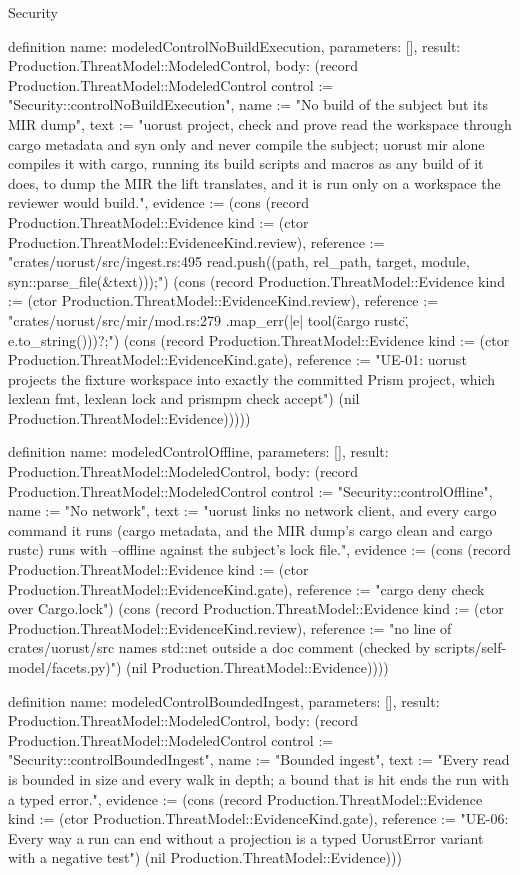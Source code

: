 \begin{lexlean}{Security}
\begin{semanticmodule}
definition{
  name: modeledControlNoBuildExecution,
  parameters: [],
  result: Production.ThreatModel::ModeledControl,
  body: (record Production.ThreatModel::ModeledControl {control := "Security::controlNoBuildExecution", name := "No build of the subject but its MIR dump", text := "uorust project, check and prove read the workspace through cargo metadata and syn only and never compile the subject; uorust mir alone compiles it with cargo, running its build scripts and macros as any build of it does, to dump the MIR the lift translates, and it is run only on a workspace the reviewer would build.", evidence := (cons (record Production.ThreatModel::Evidence {kind := (ctor Production.ThreatModel::EvidenceKind.review), reference := "crates/uorust/src/ingest.rs:495 read.push((path, rel_path, target, module, syn::parse_file(&text)));"}) (cons (record Production.ThreatModel::Evidence {kind := (ctor Production.ThreatModel::EvidenceKind.review), reference := "crates/uorust/src/mir/mod.rs:279 .map_err(|e| tool(\"cargo rustc\", e.to_string()))?;"}) (cons (record Production.ThreatModel::Evidence {kind := (ctor Production.ThreatModel::EvidenceKind.gate), reference := "UE-01: uorust projects the fixture workspace into exactly the committed Prism project, which lexlean fmt, lexlean lock and prismpm check accept"}) (nil Production.ThreatModel::Evidence))))})
}

definition{
  name: modeledControlOffline,
  parameters: [],
  result: Production.ThreatModel::ModeledControl,
  body: (record Production.ThreatModel::ModeledControl {control := "Security::controlOffline", name := "No network", text := "uorust links no network client, and every cargo command it runs (cargo metadata, and the MIR dump's cargo clean and cargo rustc) runs with --offline against the subject's lock file.", evidence := (cons (record Production.ThreatModel::Evidence {kind := (ctor Production.ThreatModel::EvidenceKind.gate), reference := "cargo deny check over Cargo.lock"}) (cons (record Production.ThreatModel::Evidence {kind := (ctor Production.ThreatModel::EvidenceKind.review), reference := "no line of crates/uorust/src names std::net outside a doc comment (checked by scripts/self-model/facets.py)"}) (nil Production.ThreatModel::Evidence)))})
}

definition{
  name: modeledControlBoundedIngest,
  parameters: [],
  result: Production.ThreatModel::ModeledControl,
  body: (record Production.ThreatModel::ModeledControl {control := "Security::controlBoundedIngest", name := "Bounded ingest", text := "Every read is bounded in size and every walk in depth; a bound that is hit ends the run with a typed error.", evidence := (cons (record Production.ThreatModel::Evidence {kind := (ctor Production.ThreatModel::EvidenceKind.gate), reference := "UE-06: Every way a run can end without a projection is a typed UorustError variant with a negative test"}) (nil Production.ThreatModel::Evidence))})
}


\end{semanticmodule}
\end{lexlean}
